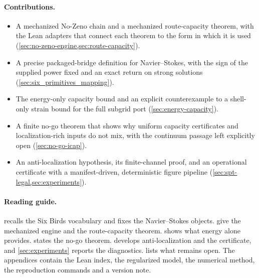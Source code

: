 \paragraph{Contributions.}
\begin{itemize}
\item A mechanized No-Zeno chain and a mechanized route-capacity theorem, with the Lean adapters
that connect each theorem to the form in which it is used (\cref{sec:no-zeno-engine,sec:route-capacity}).
\item A precise packaged-bridge definition for Navier--Stokes, with the sign of the supplied power
fixed and an exact return on strong solutions (\cref{sec:six_primitives_mapping}).
\item The energy-only capacity bound and an explicit counterexample to a shell-only strain bound for the full
subgrid port (\cref{sec:energy-capacity}).
\item A finite no-go theorem that shows why uniform capacity certificates and localization-rich
inputs do not mix, with the continuum passage left explicitly open (\cref{sec:no-go-icap}).
\item An anti-localization hypothesis, its finite-channel proof, and an operational certificate
with a manifest-driven, deterministic figure pipeline (\cref{sec:spt-legal,sec:experiments}).
\end{itemize}

\paragraph{Reading guide.}
 recalls the Six Birds vocabulary and fixes the Navier--Stokes
objects.  give the mechanized engine and the route-capacity
theorem.  shows what energy alone provides.  states
the no-go theorem.  develops anti-localization and the certificate, and
\cref{sec:experiments} reports the diagnostics.  lists what remains open.
The appendices contain the Lean index, the regularized model, the numerical method, the
reproduction commands and a version note.
